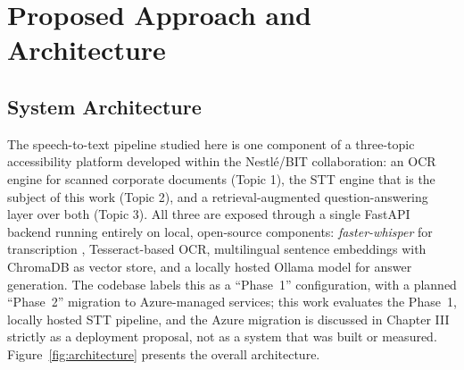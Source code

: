 \documentclass[12pt]{report}
\begin{document}
\section{Proposed Approach and Architecture}
\subsection{System Architecture}
The speech-to-text pipeline studied here is one component of a three-topic accessibility platform developed within the Nestl\'e/BIT collaboration: an OCR engine for scanned corporate documents (Topic 1), the STT engine that is the subject of this work (Topic 2), and a retrieval-augmented question-answering layer over both (Topic 3). All three are exposed through a single FastAPI backend running entirely on local, open-source components: \textit{faster-whisper} for transcription \cite{fasterwhisper2023}, Tesseract-based OCR, multilingual sentence embeddings with ChromaDB as vector store, and a locally hosted Ollama model for answer generation. The codebase labels this as a \enquote{Phase~1} configuration, with a planned \enquote{Phase~2} migration to Azure-managed services; this work evaluates the Phase~1, locally hosted STT pipeline, and the Azure migration is discussed in Chapter III strictly as a deployment proposal, not as a system that was built or measured. Figure~\ref{fig:architecture} presents the overall architecture.
\end{document}

